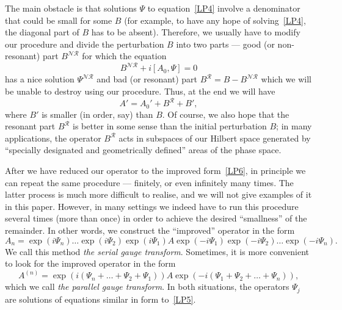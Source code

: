 \documentclass[AHL,Unicode,longabstracts,published]{cedram}
\newcommand{\CN}{\mathcal{N}}
\newcommand{\CR}{\mathcal{R}}
\newcommand{\CNR}{{\CN\!\CR}}
\begin{document}
The main obstacle is that solutions $\Psi$ to equation~\eqref{LP4} involve a denominator that could be small for some $B$ (for example, to have any hope of solving~\eqref{LP4}, the diagonal part of $B$ has to be absent). Therefore, we usually have to modify our procedure and divide the perturbation $B$ into two parts --- good (or non-resonant) part $B^{\CNR}$ for which the equation
\begin{equation}\label{LP5}
B^{\CNR} + i[A_0,\Psi]=0
\end{equation}
has a nice solution $\Psi^{\CNR}$ and bad (or resonant) part $B^{\CR}=B-B^{\CNR}$ which we will be unable to destroy using our procedure. Thus, at the end we will have
\begin{equation}\label{LP6}
A' = A_0' + B^{\CR}+B',
\end{equation}
where $B'$ is smaller (in order, say) than $B$. Of course, we also hope that the resonant part $B^{\CR}$ is better in some sense than the initial perturbation $B$; in many applications, the operator $B^{\CR}$ acts in subspaces of our Hilbert space generated by ``specially designated and geometrically defined'' areas of the phase space.


After we have reduced our operator to the improved form~\eqref{LP6}, in principle we can repeat the same procedure --- finitely, or even infinitely many times. The latter process is much more difficult to realise, and we will not give examples of it in this paper. However, in many settings we indeed have to run this procedure several times (more than once) in order to achieve the desired ``smallness'' of the remainder. In other words, we construct the ``improved'' operator in the form
\begin{equation}\label{LP7}
A_n = \exp(i \Psi_n)\dots\exp(i \Psi_2)\exp(i \Psi_1)A\exp(-i \Psi_1)\exp(-i \Psi_2)\dots\exp(-i \Psi_n).
\end{equation}
We call this method {\emph {the serial gauge transform}}. Sometimes, it is more convenient to look for the improved operator in the form
\begin{equation}\label{LP8}
A^{(n)} = \exp(i (\Psi_n+\dotso+ \Psi_2+\Psi_1))A\exp(-i (\Psi_1+\Psi_2+\dotso +\Psi_n)),
\end{equation}
which we call {\emph {the parallel gauge transform}}. In both situations, the operators $\Psi_j$ are solutions of equations similar in form to~\eqref{LP5}.
\end{document}
